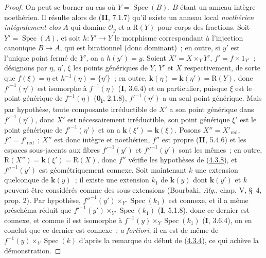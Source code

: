 \begin{proof}
On peut se borner au cas où $Y=\operatorname{Spec}(B)$, $B$ étant un anneau
intègre noethérien. Il résulte alors de (\textbf{II}, 7.1.7) qu'il existe un anneau
local \emph{noethérien intégralement clos} $A$ qui domine $\mathcal O_y$ et a
$\mathrm R(Y)$ pour corps des fractions. Soit
$Y'=\operatorname{Spec}(A)$, et soit $h:Y'\to Y$ le morphisme correspondant
à l'injection canonique $B\to A$, qui est birationnel (donc dominant)~; en
outre, si $y'$ est l'unique point fermé de $Y'$, on a $h(y')=y$. Soient
$X'=X\times_YY'$, $f'=f\times1_{Y'}$~; désignons par $\eta$, $\eta'$,
$\xi$ les points génériques de $Y$, $Y'$ et $X$ respectivement, de sorte
que $f(\xi)=\eta$ et $h^{-1}(\eta)=\{\eta'\}$~; en outre,
$\boldsymbol{k}(\eta)=\boldsymbol{k}(\eta')=\mathrm R(Y)$, donc $f'^{-1}(\eta')$ est isomorphe à
$f^{-1}(\eta)$ (\textbf{I}, 3.6.4) et en particulier, puisque $\xi$ est le point
générique de $f^{-1}(\eta)$ (\textbf{0}\textsubscript{I}, 2.1.8),
$f'^{-1}(\eta')$ a un seul point générique. Mais par hypothèse, toute
composante irréductible de $X'$ a son point générique dans
$f'^{-1}(\eta')$, donc $X'$ est nécessairement irréductible, son point
générique $\xi'$ est le point générique de $f'^{-1}(\eta')$ et on a
$\boldsymbol{k}(\xi')=\boldsymbol{k}(\xi)$.
Posons $X''=X'_{\mathrm{red}}$, $f''=f'_{\mathrm{red}}$~; $X''$ est donc
intègre et noethérien, $f''$ est propre (\textbf{II}, 5.4.6) et les espaces
sous-jacents aux fibres $f'^{-1}(y')$ et $f''^{-1}(y')$ sont les mêmes~; en
outre, $\mathrm R(X'')=\boldsymbol{k}(\xi')=\mathrm R(X)$, donc $f''$ vérifie les
hypothèses de (\hyperref[III.4.3.8-fr]{4.3.8}), et $f''^{-1}(y')$ est
géométriquement connexe. Soit maintenant $k$ une extension quelconque de
$\boldsymbol{k}(y)$~; il existe une extension $k_1$ de $\boldsymbol{k}(y)$ dont $\boldsymbol{k}(y')$ et $k$ peuvent
être considérés comme des sous-extensions (Bourbaki, \emph{Alg.}, chap. V,
\S~4, prop. 2). Par hypothèse,
$f''^{-1}(y')\times_{Y'}\operatorname{Spec}(k_1)$ est connexe, et il a même
préschéma réduit que
$f'^{-1}(y')\times_{Y'}\operatorname{Spec}(k_1)$ (\textbf{I}, 5.1.8), donc ce dernier
est connexe, et comme il est isomorphe à
$f^{-1}(y)\times_Y\operatorname{Spec}(k_1)$ (\textbf{I}, 3.6.4), on en conclut que ce
dernier est connexe~; \emph{a fortiori}, il en est de même de
$f^{-1}(y)\times_Y\operatorname{Spec}(k)$ d'après la remarque du début de
(\hyperref[III.4.3.4-fr]{4.3.4}), ce qui achève la démonstration.
\end{proof}

